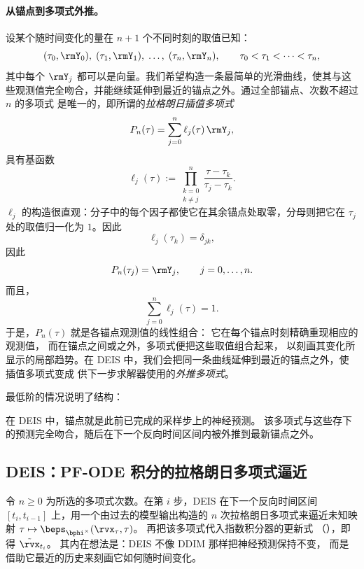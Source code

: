 \paragraph{从锚点到多项式外推。}
设某个随时间变化的量在 $n{+}1$ 个不同时刻的取值已知：
\[
(\tau_0,\rmY_0),\;
(\tau_1,\rmY_1),\;
\ldots,\;
(\tau_n,\rmY_n),
\qquad
\tau_0<\tau_1<\cdots<\tau_n,
\]
其中每个 $\rmY_j$ 都可以是向量。我们希望构造一条最简单的光滑曲线，使其与这些观测值完全吻合，并能继续延伸到最近的锚点之外。通过全部锚点、次数不超过 $n$ 的多项式
是唯一的，即所谓的\emph{拉格朗日插值多项式}
\[
P_n(\tau)
=
\sum_{j=0}^{n}
\ell_j(\tau)\,\rmY_j,
\]
具有基函数
\[
\ell_j(\tau)
:=
\prod_{\substack{k=0\\k\neq j}}^{n}
\frac{\tau-\tau_k}{\tau_j-\tau_k}.
\]
$\ell_j$ 的构造很直观：分子中的每个因子都使它在其余锚点处取零，分母则把它在 $\tau_j$ 处的取值归一化为 $1$。因此
\[
\ell_j(\tau_k)=\delta_{jk},
\]
因此
\[
P_n(\tau_j)=\rmY_j,
\qquad
j=0,\ldots,n.
\]
而且，
\[
\sum_{j=0}^{n}\ell_j(\tau)=1.
\]
于是，$P_n(\tau)$ 就是各锚点观测值的线性组合：
它在每个锚点时刻精确重现相应的观测值，
而在锚点之间或之外，多项式便把这些取值组合起来，
以刻画其变化所显示的局部趋势。在 DEIS 中，我们会把同一条曲线延伸到最近的锚点之外，使插值多项式变成
供下一步求解器使用的\emph{外推多项式}。

最低阶的情况说明了结构：


在 DEIS 中，锚点就是此前已完成的采样步上的神经预测。
该多项式与这些存下的预测完全吻合，随后在下一个反向时间区间内被外推到最新锚点之外。


\subsection{DEIS：PF-ODE 积分的拉格朗日多项式逼近}
\label{subsec:deis-lagrange}

令 $n \ge 0$ 为所选的多项式次数。在第 $i$ 步，DEIS 在下一个反向时间区间 $[t_i,t_{i-1}]$ 上，用一个由过去的模型输出构造的 $n$ 次拉格朗日多项式来逼近未知映射
$\tau \mapsto \beps_{\bphi^\times}(\rvx_\tau,\tau)$。
再把该多项式代入指数积分器的更新式
（），即得 $\tilde{\rvx}_{t_i}$。
其内在想法是：DEIS 不像 DDIM 那样把神经预测保持不变，
而是借助它最近的历史来刻画它如何随时间变化。


